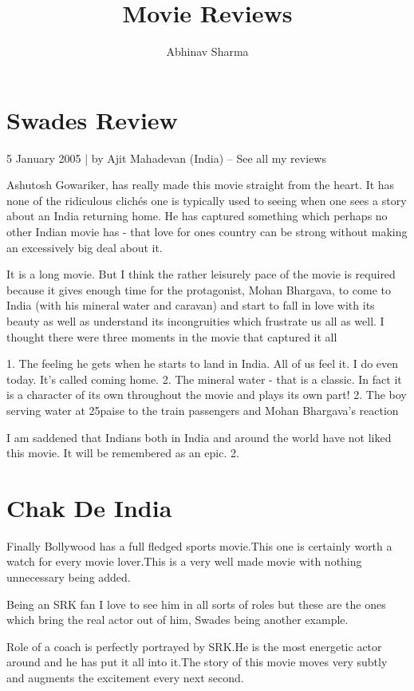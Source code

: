 \documentclass[]{article}
\title{Movie Reviews}
\author{Abhinav Sharma}
\date
\begin{document}
\maketitle
\section{Swades Review}
5 January 2005 | by Ajit Mahadevan (India) – See all my reviews

Ashutosh Gowariker, has really made this movie straight from the heart. It has none of the ridiculous clichés one is typically used to seeing when one sees a story about an India returning home. He has captured something which perhaps no other Indian movie has - that love for ones country can be strong without making an excessively big deal about it.

It is a long movie. But I think the rather leisurely pace of the movie is required because it gives enough time for the protagonist, Mohan Bhargava, to come to India (with his mineral water and caravan) and start to fall in love with its beauty as well as understand its incongruities which frustrate us all as well. I thought there were three moments in the movie that captured it all

1. The feeling he gets when he starts to land in India. All of us feel it. I do even today. It's called coming home. 2. The mineral water - that is a classic. In fact it is a character of its own throughout the movie and plays its own part! 2. The boy serving water at 25paise to the train passengers and Mohan Bhargava's reaction

I am saddened that Indians both in India and around the world have not liked this movie. It will be remembered as an epic. 2.

\section{Chak De India}
Finally Bollywood has a full fledged sports movie.This one is certainly worth a watch for every movie lover.This is a very well made movie with nothing unnecessary being added.

Being an SRK fan I love to see him in all sorts of roles but these are the ones which bring the real actor out of him, Swades being another example.

Role of a coach is perfectly portrayed by SRK.He is the most energetic actor around and he has put it all into it.The story of this movie moves very subtly and augments the excitement every next second.
\end{document}
